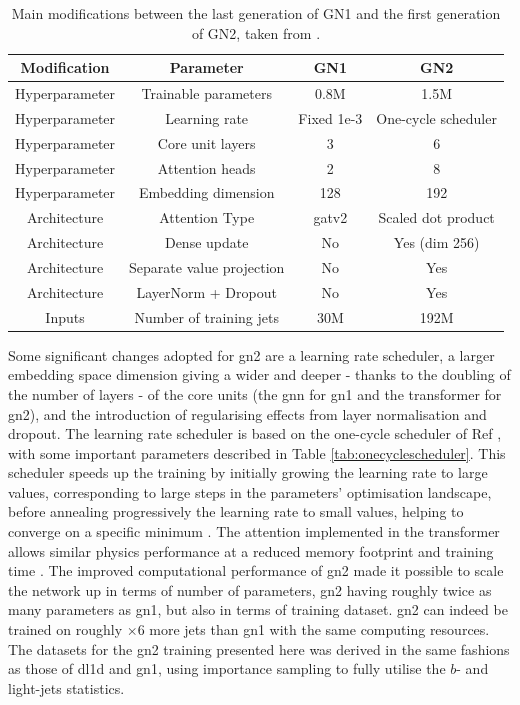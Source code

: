 \begin{table}[h]
  \begin{center}
      \begin{tabular}{c|c|c|c} 
      	 \hline \hline
          Modification & Parameter & GN1 & GN2 \\ \hline
          Hyperparameter  & Trainable parameters & 0.8M & 1.5M \\ 
          Hyperparameter  & Learning rate & Fixed 1e-3 & One-cycle scheduler\\ 
          Hyperparameter  & Core unit layers & 3 & 6 \\ 
          Hyperparameter  & Attention heads & 2 & 8 \\ 
          Hyperparameter  & Embedding dimension & 128 & 192 \\ \hline
          Architecture    & Attention Type & \gls{gat}v2 & Scaled dot product \\ 
          Architecture    & Dense update & No & Yes (dim 256) \\ 
          Architecture    & Separate value projection & No & Yes \\ 
          Architecture    & LayerNorm + Dropout & No & Yes \\ \hline
          Inputs          & Number of training jets & 30M & 192M  \\ \hline \hline
      \end{tabular}
    \caption{Main modifications between the last generation of GN1 and the first generation of GN2, taken from \cite{ATL-PLOT-FTAG-2023-01}.}
    \label{tab:gn2compGN1}
  \end{center}
\end{table}

Some significant changes adopted for \gls{gn2} are a learning rate scheduler, a larger embedding space dimension giving a wider and deeper - thanks to the doubling of the number of layers - of the core units (the \gls{gnn} for \gls{gn1} and the transformer for \gls{gn2}), and the introduction of regularising effects from layer normalisation and dropout. The learning rate scheduler is based on the one-cycle scheduler of Ref \cite{smith2018disciplined}, with some important  parameters described in Table \ref{tab:onecyclescheduler}. This scheduler speeds up the training by initially growing the learning rate to large values, corresponding to large steps in the parameters' optimisation landscape, before annealing progressively the learning rate to small values, helping to converge on a specific minimum \cite{smith2018superconvergence}. The attention implemented in the transformer allows similar physics performance at a reduced memory footprint and training time \cite{duperrin2023flavour}. The improved computational performance of \gls{gn2} made it possible to scale the network up in terms of number of parameters, \gls{gn2} having roughly twice as many parameters as \gls{gn1}, but also in terms of training dataset. \gls{gn2} can indeed be trained on roughly $\times 6$ more jets than \gls{gn1} with the same computing resources. The datasets for the \gls{gn2} training presented here was derived in the same fashions as those of \gls{dl1d} and \gls{gn1}, using importance sampling to fully utilise the $b$- and light-jets statistics. 

